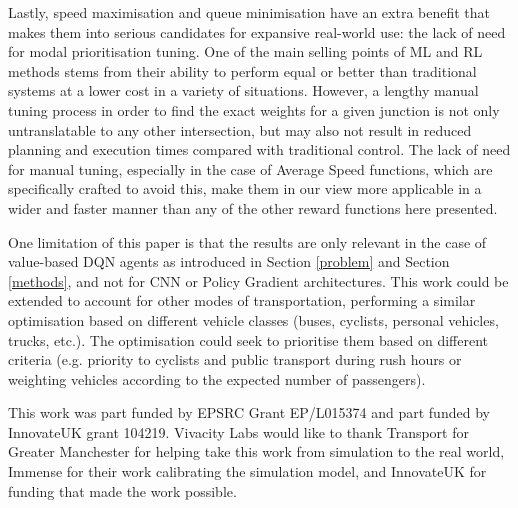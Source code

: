 \documentclass[sigconf,anonymous]{aamas}
\begin{document}
Lastly, speed maximisation and queue minimisation have an extra benefit that makes them into serious candidates for expansive real-world use: the lack of need for modal prioritisation tuning.
One of the main selling points of ML and RL methods stems from their ability to perform equal or better than traditional systems at a lower cost in a variety of situations.
However, a lengthy manual tuning process in order to find the exact weights for a given junction is not only untranslatable to any other intersection, but may also not result in reduced planning and execution times compared with traditional control.
The lack of need for manual tuning, especially in the case of Average Speed functions, which are specifically crafted to avoid this, make them in our view more applicable in a wider and faster manner than any of the other reward functions here presented.

One limitation of this paper is that the results are only relevant in the case of value-based DQN agents as introduced in Section \ref{problem} and Section \ref{methods}, and not for CNN or Policy Gradient architectures.
This work could be extended to account for other modes of transportation, performing a similar optimisation based on different vehicle classes (buses, cyclists, personal vehicles, trucks, etc.). The optimisation could seek to prioritise them based on different criteria (e.g. priority to cyclists and public transport during rush hours or weighting vehicles according to the expected number of passengers).




\begin{acks}
This work was part funded by EPSRC Grant EP/L015374 and part funded by InnovateUK grant 104219. 
Vivacity Labs would like to thank Transport for Greater Manchester for helping take this work from simulation to the real world, Immense for their work calibrating the simulation model, and InnovateUK for funding that made the work possible.
\end{acks}



 


\end{document}
